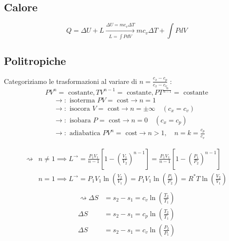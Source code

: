\documentclass[a4paper]{report}
\begin{document}
\subsection*{Calore}
\[
    Q = \Delta U + L \xrightarrow[L=\int P dV]{\Delta U = mc_v\Delta T} \boxed{mc_v\Delta T + \int P dV}
\]

\subsection*{Politropiche}
Categoriziamo le trasformazioni al variare di $\boxed{n = \frac{c_x-c_p}{c_x-c_v} }$ :
\[
    \boxed{PV^n=\text{ costante}},\boxed{TV^{n-1}=\text{ costante}}, \boxed{PT^{\frac{n}{n-1}}=\text{ costante}}
\]
\begin{align*}
    & \rightarrow : \text{ isoterma } PV= \text{ cost}\rightarrow n=1 \\
    & \rightarrow : \text{ isocora } V= \text{ cost}\rightarrow n=\pm \infty \quad (c_x=c_v)\\
    & \rightarrow : \text{ isobara } P= \text{ cost}\rightarrow n= 0 \quad (c_x=c_p)\\
    & \rightarrow : \text{ adiabatica } PV^n= \text{ cost}\rightarrow n> 1, \quad n=k=\frac{c_p}{c_v}
\end{align*}

\begin{align*}
    \rightsquigarrow & n \neq 1 \implies \boxed{ L^\rightarrow = \frac{P_1V_1}{n-1}\left[1-\left(\frac{V_1}{V_2}\right)^{n-1}\right]=\frac{P_1V_1}{n-1}\left[1-\left(\frac{P_1}{P_2}\right)^{n-1}\right]}\\
    & n = 1 \implies \boxed{L^\rightarrow = P_1V_1\ln\left(\frac{V_2}{V_1}\right)=P_1V_1\ln\left(\frac{P_1}{P_2}\right)=R^*T\ln\left(\frac{V_2}{V_1}\right)}\\
\end{align*}
\begin{align*}
    \rightsquigarrow \Delta S & = s_2-s_1 = c_v \ln\left(\frac{T_2}{T_1}\right)\\
    \Delta S & = s_2-s_1 = c_p \ln\left(\frac{T_2}{T_1}\right)\\
    \Delta S & = s_2-s_1 = c_v \ln\left(\frac{P_2}{P_1}\right)
\end{align*}


\end{document}

